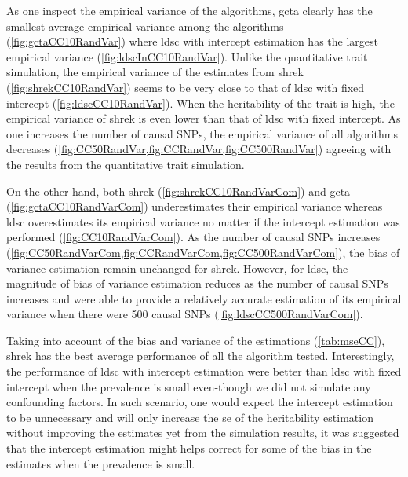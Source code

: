 		As one inspect the empirical variance of the algorithms, \gls{gcta} clearly has the smallest average empirical variance among the algorithms (\cref{fig:gctaCC10RandVar}) where \gls{ldsc} with intercept estimation has the largest empirical variance (\cref{fig:ldscInCC10RandVar}). 
		Unlike the quantitative trait simulation, the empirical variance of the estimates from \gls{shrek} (\cref{fig:shrekCC10RandVar}) seems to be very close to that of \gls{ldsc} with fixed intercept (\cref{fig:ldscCC10RandVar}).
		When the heritability of the trait is high, the empirical variance of \gls{shrek} is even lower than that of \gls{ldsc} with fixed intercept. 
		As one increases the number of causal \glspl{SNP}, the empirical variance of all algorithms decreases (\cref{fig:CC50RandVar,fig:CCRandVar,fig:CC500RandVar}) agreeing with the results from the quantitative trait simulation.
		
		On the other hand, both \gls{shrek} (\cref{fig:shrekCC10RandVarCom}) and \gls{gcta} (\cref{fig:gctaCC10RandVarCom}) underestimates their empirical variance whereas \gls{ldsc} overestimates its empirical variance no matter if the intercept estimation was performed  (\cref{fig:CC10RandVarCom}).
		As the number of causal \glspl{SNP} increases (\cref{fig:CC50RandVarCom,fig:CCRandVarCom,fig:CC500RandVarCom}), the bias of variance estimation remain unchanged for \gls{shrek}. 
		However, for \gls{ldsc}, the magnitude of bias of variance estimation reduces as the number of causal \glspl{SNP} increases and were able to provide a relatively accurate estimation of its empirical variance when there were 500 causal \glspl{SNP} (\cref{fig:ldscCC500RandVarCom}).
		
		
		Taking into account of the bias and variance of the estimations (\cref{tab:mseCC}), \gls{shrek} has the best average performance of all the algorithm tested.
		Interestingly, the performance of \gls{ldsc} with intercept estimation were better than \gls{ldsc} with fixed intercept when the prevalence is small even-though we did not simulate any confounding factors.
		In such scenario, one would expect the intercept estimation to be unnecessary and will only increase the \gls{se} of the heritability estimation without improving the estimates yet from the simulation results, it was suggested that the intercept estimation might helps correct for some of the bias in the estimates when the prevalence is small.

